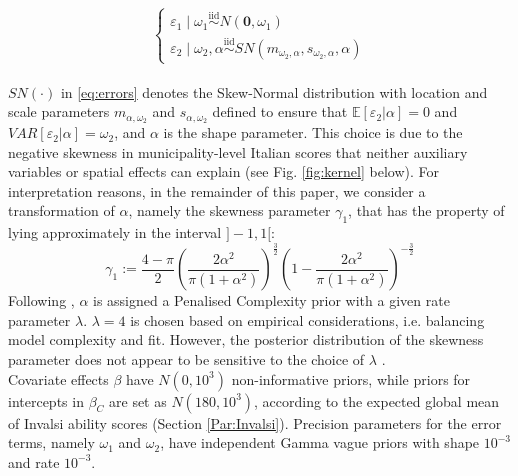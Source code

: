 \documentclass[openany]{book}
\begin{document}
\begin{equation}
\left\{
\begin{array}{ll}
\varepsilon_{1} \mid \omega_1 \overset{\text{iid}}{\sim}
N(\mathbf{0}, \omega_1)\\
\varepsilon_{2} \mid \omega_2, \alpha 
\overset{\text{iid}}{\sim} SN(m_{\omega_2, \alpha}, s_{\omega_2, \alpha}, \alpha)  
\end{array}
\right.
\label{eq:errors}
\end{equation} \\
$SN(\cdot)$ in \ref{eq:errors} denotes the Skew-Normal distribution \citep{SN} with location and scale parameters $m_{\alpha, \omega_2}$ and $ s_{\alpha, \omega_2}$ defined to ensure that $\mathbb{E}[\varepsilon_2 | \alpha] = 0 $ and $VAR[\varepsilon_2 | \alpha] = \omega_2$, and $\alpha$ is the shape parameter. This choice is due to the negative skewness in municipality-level Italian scores that neither auxiliary variables or spatial effects can explain (see Fig. \ref{fig:kernel} below). For interpretation reasons, in the remainder of this paper, we consider a transformation of $\alpha$, namely the skewness parameter $\gamma_1$, that has the property of lying approximately in the interval $]-1, 1[$:
$$
\gamma_{1} := \frac{4-\pi}{2}
\left(  \frac{2 \alpha^2}{\pi(1 + \alpha^2)} \right)^{\frac{3}{2}}
\left(  1 - \frac{2 \alpha^2}{\pi(1 + \alpha^2)} \right)^{-\frac{3}{2}}
$$
Following \cite{SNprior}, $\alpha$ is assigned a Penalised Complexity prior \cite{PC} with a given rate parameter $\lambda$. %
$\lambda = 4$ is chosen based on empirical considerations, i.e. balancing model complexity and fit. However, the posterior distribution of the skewness parameter does not appear to be sensitive to the choice of $\lambda$ \citep{SNprior}.\\

Covariate effects $\beta$ have $N(0, 10^3)$ non-informative priors, while priors for intercepts in $\beta_C$ are set as $N(180, 10^3)$, according to the expected global mean of Invalsi ability scores (Section \ref{Par:Invalsi}).
Precision parameters for the error terms, namely $\omega_{1}$ and $\omega_2$, have independent Gamma vague priors with shape $10^{-3}$ and rate $10^{-3}$.
\end{document}
